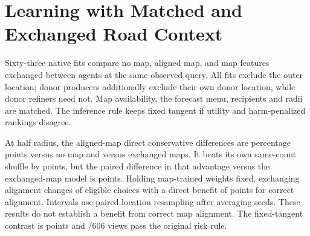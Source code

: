 \section{Learning with Matched and Exchanged Road Context}
Sixty-three native fits compare no map, aligned map, and map features
exchanged between agents at the same observed query. All fits exclude
the outer location; donor producers additionally exclude their own
donor location, while donor refiners need not. Map availability, the
forecast menu, recipients and radii are matched. The inference rule
keeps fixed tangent if utility and harm-penalized rankings disagree.

At half radius, the aligned-map direct conservative differences are
\LearnedRoadNoMap{} percentage points versus no map and
\LearnedRoadWrong{} versus exchanged maps. It beats its own same-count
shuffle by \LearnedRoadShuffle{} points, but the paired difference
in that advantage versus the exchanged-map model is
\LearnedRoadMargin{} points. Holding map-trained weights fixed,
exchanging alignment changes \LearnedRoadChanged{} of
\LearnedRoadEligible{} eligible choices with a direct benefit of
\LearnedRoadSwap{} points for correct alignment. Intervals use
paired location resampling after averaging seeds. These results do
not establish a benefit from correct map alignment. The fixed-tangent
contrast is \LearnedRoadTangent{} points and
\LearnedRoadPass/606 views pass the original risk rule.
